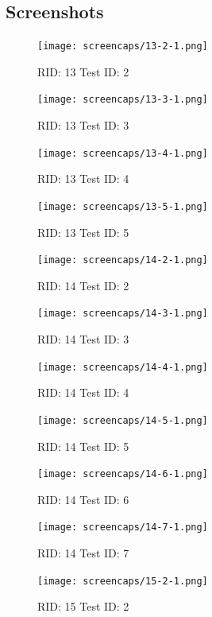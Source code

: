 \documentclass{article}
\begin{document}
\subsection*{Screenshots}

\begin{figure}[H]
\texttt{[image: screencaps/13-2-1.png]}
\caption{RID: 13 Test ID: 2}
\end{figure}

\begin{figure}[H]
\texttt{[image: screencaps/13-3-1.png]}
\caption{RID: 13 Test ID: 3}
\end{figure}


\begin{figure}[H]
\texttt{[image: screencaps/13-4-1.png]}
\caption{RID: 13 Test ID: 4}
\end{figure}

\begin{figure}[H]
\texttt{[image: screencaps/13-5-1.png]}
\caption{RID: 13 Test ID: 5}
\end{figure}



\begin{figure}[H]
\texttt{[image: screencaps/14-2-1.png]}
\caption{RID: 14 Test ID: 2}
\end{figure}

\begin{figure}[H]
\texttt{[image: screencaps/14-3-1.png]}
\caption{RID: 14 Test ID: 3}
\end{figure}

\begin{figure}[H]
\texttt{[image: screencaps/14-4-1.png]}
\caption{RID: 14 Test ID: 4}
\end{figure}


\begin{figure}[H]
\texttt{[image: screencaps/14-5-1.png]}
\caption{RID: 14 Test ID: 5}
\end{figure}


\begin{figure}[H]
\texttt{[image: screencaps/14-6-1.png]}
\caption{RID: 14 Test ID: 6}
\end{figure}

\begin{figure}[H]
\texttt{[image: screencaps/14-7-1.png]}
\caption{RID: 14 Test ID: 7}
\end{figure}



\begin{figure}[H]
\texttt{[image: screencaps/15-2-1.png]}
\caption{RID: 15 Test ID: 2}
\end{figure}
\end{document}
